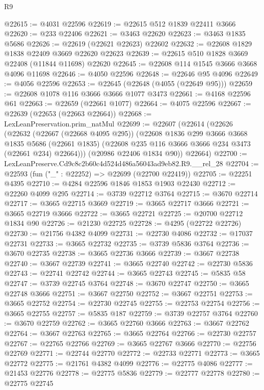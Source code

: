 \begin{lexlean}{R9}
\begin{coremodule}
@22615 := @4031 @22596
@22619 := @22615 @512 @1839 @22411 @3666
@22620 := @233 @22406
@22621 := @3463 @22620
@22623 := @3463 @1835 @5686
@22626 := @22619 (@22621 @22623) @22602
@22632 := @22608 @1829 @1838 @22409 @3669 @22620 @22623
@22639 := @22615 @510 @1828 @3669 @22408 (@11844 @11698) @22620
@22645 := @22608 @114 @1545 @3666 @3668 @4096 @11698
@22646 := @4050 @22596
@22648 := @22646 @95 @4096
@22649 := @4056 @22596
@22653 := @22645 (@22648 (@4055 (@22649 @95)))
@22659 := @22608 @1078 @116 @3666 @3666 @1077 @3473
@22661 := @4168 @22596 @61
@22663 := @22659 (@22661 @1077)
@22664 := @4075 @22596
@22667 := @22639 (@22653 (@22663 @22664))
@22668 := LexLeanPreservation.prim_natMul
@22699 := @22607
    (@22614
      (@22626
        (@22632
          (@22667 (@22668 @4095 @295))
          (@22608
            @1836
            @299
            @3666
            @3668
            @1835
            @5686
            (@22661 @1835)
            (@22608 @235 @116 @3666 @3666 @234 @3473 (@22661 @234) @22664)))
        (@20986 @22406 @1834 @90))
      @22664)
@22700 := LexLeanPreserve.Cd9c8c2b60c4d524d486a56043ad9eb82.R9.__rel_28
@22704 := @22593 (fun ("_" : @22252) => @22699 (@22700 @22419))
@22705 := @22251 @4395
@22710 := @4284 @22596 @1846 @1853 @1903 @22430
@22712 := @22260 @4099 @295
@22714 := @3739 @22712 @3764
@22715 := @3670 @22714
@22717 := @3665 @22715 @3669
@22719 := @3665 @22717 @3666
@22721 := @3665 @22719 @3666
@22722 := @3665 @22721
@22725 := @20700 @22712 @1834 @90
@22726 := @21230 @22725
@22728 := @4295 (@22722 @22726)
@22730 := @21756 @4382 @4099
@22731 := @22730 @4086
@22732 := @17037 @22731
@22733 := @3665 @22732
@22735 := @3739 @5836 @3764
@22736 := @3670 @22735
@22738 := @3665 @22736 @3666
@22739 := @3667 @22738
@22740 := @3667 @22739
@22741 := @3665 @22740
@22742 := @22730 @5836
@22743 := @22741 @22742
@22744 := @3665 @22743
@22745 := @5835 @58
@22747 := @3739 @22745 @3764
@22748 := @3670 @22747
@22750 := @3665 @22748 @3666
@22751 := @3667 @22750
@22752 := @3667 @22751
@22753 := @3665 @22752
@22754 := @22730 @22745
@22755 := @22753 @22754
@22756 := @3665 @22755
@22757 := @5835 @187
@22759 := @3739 @22757 @3764
@22760 := @3670 @22759
@22762 := @3665 @22760 @3666
@22763 := @3667 @22762
@22764 := @3667 @22763
@22765 := @3665 @22764
@22766 := @22730 @22757
@22767 := @22765 @22766
@22769 := @3665 @22767 @3666
@22770 := @22756 @22769
@22771 := @22744 @22770
@22772 := @22733 @22771
@22773 := @3665 @22772
@22775 := @21761 @4382 @4099
@22776 := @22775 @4086
@22777 := @21453 @22776
@22778 := @22775 @5836
@22779 := @22777 @22778
@22780 := @22775 @22745

\end{coremodule}
\end{lexlean}
